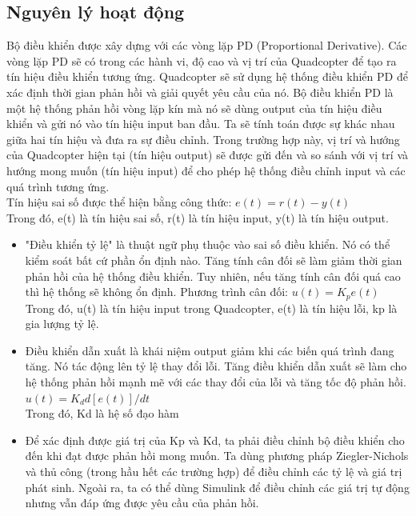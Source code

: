            \subsection{Nguyên lý hoạt động}
            Bộ điều khiển được xây dựng với các vòng lặp PD (Proportional Derivative). Các vòng lặp PD sẽ có trong các hành vi, độ cao và vị trí của Quadcopter để tạo ra tín hiệu điều khiển tương ứng. Quadcopter sẽ sử dụng hệ thống điều khiển PD để xác định thời gian phản hồi và giải quyết yêu cầu của nó. Bộ điều khiển PD là một hệ thống phản hồi vòng lặp kín mà nó sẽ dùng output của tín hiệu điều khiển và gửi nó vào tín hiệu input ban đầu. Ta sẽ tính toán được sự khác nhau giữa hai tín hiệu và đưa ra sự điều chỉnh. Trong trường hợp này, vị trí và hướng của Quadcopter hiện tại (tín hiệu output) sẽ được gửi đến và so sánh với vị trí và hướng mong muốn (tín hiệu input) để cho phép hệ thống điều chỉnh input và các quá trình tương ứng.
\\
			Tín hiệu sai số được thể hiện bằng công thức: $e(t) = r(t) - y(t)$
\\
			Trong đó, e(t) là tín hiệu sai số, r(t) là tín hiệu input, y(t) là tín hiệu output.
			\begin{itemize}
			\item "Điều khiển tỷ lệ" là thuật ngữ phụ thuộc vào sai số điều khiển. Nó có thể kiểm soát bất cứ phần ổn định nào. Tăng tính cân đối sẽ làm giảm thời gian phản hồi của hệ thống điều khiển. Tuy nhiên, nếu tăng tính cân đối quá cao thì hệ thống sẽ không ổn định. Phương trình cân đối: $u(t) = K_p e(t)$
\\
Trong đó, u(t) là tín hiệu input trong Quadcopter, e(t) là tín hiệu lỗi, kp là gia lượng tỷ lệ.
			\item Điều khiển dẫn xuất là khái niệm output giảm khi các biến quá trình đang tăng. Nó tác động lên tỷ lệ thay đổi lỗi. Tăng điều khiển dẫn xuất sẽ làm cho hệ thống phản hồi mạnh mẽ với các thay đổi của lỗi và tăng tốc độ phản hồi.
			\\
			$u(t) = K_dd[e(t)]/dt$
			\\
			Trong đó, Kd là hệ số đạo hàm
			\item Để xác định được giá trị của Kp và Kd, ta phải điều chỉnh bộ điều khiển cho đến khi đạt được phản hồi mong muốn. Ta dùng phương pháp Ziegler-Nichols và thủ công (trong hầu hết các trường hợp) để điều chỉnh các tỷ lệ và giá trị phát sinh. Ngoài ra, ta có thể dùng Simulink để điều chỉnh các giá trị tự động nhưng vẫn đáp ứng được yêu cầu của phản hồi.
			\end{itemize}
